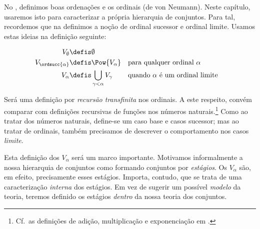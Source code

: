 \documentclass[../../../include/open-logic-section]{subfiles}
\begin{document}


No , definimos boas ordenações e os
ordinais (de von Neumann). Neste capítulo, usaremos isto para
caracterizar a própria hierarquia de conjuntos. Para tal, recordemos
que na  definimos a noção de
ordinal sucessor e ordinal limite. Usamos estas ideias na definição seguinte:

\begin{defn}
	\begin{align*}
	V_\emptyset &\defis \emptyset\\
	V_{\ordsucc{\alpha}} &\defis \Pow{V_\alpha} & & 
	\text{para qualquer ordinal }\alpha\\
	V_{\alpha} &\defis \bigcup_{\gamma < \alpha} V_\gamma & & 
	\text{quando }\alpha\text{ é um ordinal limite}
\end{align*}
\end{defn}
\noindent
Será uma definição por \emph{recursão transfinita} nos
ordinais. A este respeito, convém comparar com definições recursivas
de funções nos números naturais.\footnote{Cf.\ as
definições de adição, multiplicação e exponenciação em
.} Como ao tratar dos números
naturais, define-se um caso base e casos sucessor; mas ao tratar
de ordinais, também precisamos de descrever o comportamento nos casos
\emph{limite}. 

Esta definição dos $V_\alpha$ será um marco importante. Motivamos
informalmente a nossa hierarquia de conjuntos como formando conjuntos por
\emph{estágios}. Os $V_\alpha$ são, em efeito, precisamente esses estágios.
Importa, contudo, que se trata de uma caracterização \emph{interna} dos
estágios. Em vez de sugerir um possível \emph{modelo} da
teoria, teremos definido os estágios \emph{dentro} da nossa teoria dos conjuntos.
\end{document}
